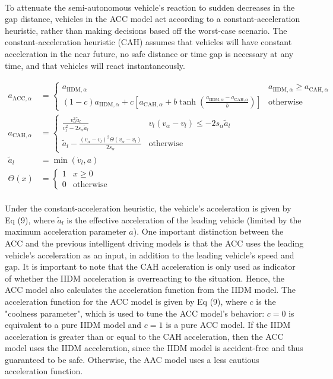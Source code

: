 \documentclass[12pt]{article}
\begin{document}
\paragraph{}
To attenuate the semi-autonomous vehicle's reaction to sudden decreases in the gap distance, vehicles in the ACC model act according to a constant-acceleration heuristic, rather than making decisions based off the worst-case scenario.  The constant-acceleration heuristic (CAH) assumes that vehicles will have constant acceleration in the near future, no safe distance or time gap is necessary at any time, and that vehicles will react instantaneously.
\begin{mymathbox}[ams gather, title=ACC Governing Functions, colframe=blue!30!black]
  \begin{align}
  a_{\text{ACC},\alpha}&= 
  \begin{cases}
  a_{\text{IIDM},\alpha} & a_{\text{IIDM},\alpha} \ge a_{\text{CAH},\alpha}\\
  (1-c)a_{\text{IIDM},\alpha} + c\left[a_{\text{CAH},\alpha} + b \tanh(\frac{a_{\text{IIDM},\alpha}-a_{\text{CAH},\alpha}}{b}) \right] & \text{otherwise}
  \end{cases}\\
  a_{\text{CAH},\alpha}&= 
  \begin{cases}
  \frac{v_\alpha^2\tilde{a}_l}{v_l^2 - 2 s_\alpha\tilde{a}_l} & v_l(v_\alpha-v_l) \le -2s_\alpha\tilde{a}_l\\
  \tilde{a}_l - \frac{(v_\alpha-v_l)^2 \Theta (v_\alpha-v_l)}{2s_\alpha} & \text{otherwise}
  \end{cases}\\
  \tilde{a}_l &= \min(\dot{v}_l, a)\\
   \Theta (x)&= 
   \begin{cases}
   1 & x\geq 0\\
   0 & \text{otherwise}
   \end{cases}
   \end{align}
\end{mymathbox}
\paragraph{}
Under the constant-acceleration heuristic, the vehicle's acceleration is given by Eq (9), where $\tilde{a}_l$ is the effective acceleration of the leading vehicle (limited by the maximum acceleration parameter $a$). One important distinction between the ACC and the previous intelligent driving models is that the ACC uses the leading vehicle's acceleration as an input, in addition to the leading vehicle's speed and gap. It is important to note that the CAH acceleration is only used as indicator of whether the IIDM acceleration is overreacting to the situation.  Hence, the ACC model also calculates the acceleration function from the IIDM model.  The acceleration function for the ACC model is given by Eq (9), where $c$ is the "coolness parameter", which is used to tune the ACC model's behavior: $c=0$ is equivalent to a pure IIDM model and $c=1$ is a pure ACC model.  If the IIDM acceleration is greater than or equal to the CAH acceleration, then the ACC model uses the IIDM acceleration, since the IIDM model is accident-free and thus guaranteed to be safe.  Otherwise, the AAC model uses a less cautious acceleration function.
\end{document}
